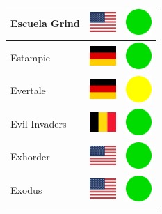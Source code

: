 \documentclass[12pt, a4paper, twoside]{report}
\begin{document}
\begin{center}
\begin{longtable}{|p{5cm}|p{2cm}|p{2cm}|}
 Escuela Grind                                              & \includegraphics[width=1cm]{../4x3/us} &   \includegraphics[width=1cm]{../likes/y} \\ \hline
 Estampie                                                   & \includegraphics[width=1cm]{../4x3/de} &   \includegraphics[width=1cm]{../likes/y} \\ \hline
 Evertale                                                   & \includegraphics[width=1cm]{../4x3/de} &   \includegraphics[width=1cm]{../likes/m} \\ \hline
 Evil Invaders                                              & \includegraphics[width=1cm]{../4x3/be} &   \includegraphics[width=1cm]{../likes/y} \\ \hline
 Exhorder                                                   & \includegraphics[width=1cm]{../4x3/us} &   \includegraphics[width=1cm]{../likes/y} \\ \hline
 Exodus                                                     & \includegraphics[width=1cm]{../4x3/us} &   \includegraphics[width=1cm]{../likes/y} \\ \hline

\end{longtable}
\end{center}
\end{document}
